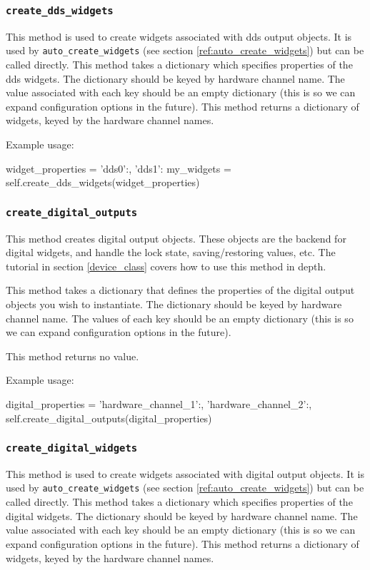 \documentclass[12pt]{article}
\begin{document}
\subsubsection{\texttt{create\_dds\_widgets}}\label{ref:create_dds_widgets}
This method is used to create widgets associated with dds output objects.
It is used by \texttt{auto\_create\_widgets} (see section \ref{ref:auto_create_widgets}) but can be called directly.
This method takes a dictionary which specifies properties of the dds widgets.
The dictionary should be keyed by hardware channel name.
The value associated with each key should be an empty dictionary (this is so we can expand configuration options in the future).
This method returns a dictionary of widgets, keyed by the hardware channel names.

Example usage:
\begin{python}
widget_properties = {'dds0':{},
                     'dds1':{}
                    }
my_widgets = self.create_dds_widgets(widget_properties)
\end{python}


\subsubsection{\texttt{create\_digital\_outputs}}\label{ref:create_digital_outputs}
This method creates digital output objects. 
These objects are the backend for digital widgets, and handle the lock state,  saving/restoring values, etc.
The tutorial in section \ref{device_class} covers how to use this method in depth.

This method takes a dictionary that defines the properties of the digital output objects you wish to instantiate. 
The dictionary should be keyed by hardware channel name.
The values of each key should be an empty dictionary (this is so we can expand configuration options in the future).

This method returns no value.

Example usage:
\begin{python}
    digital_properties = {'hardware_channel_1':{},
                         'hardware_channel_2':{},
                        }
    self.create_digital_outputs(digital_properties)
\end{python}


\subsubsection{\texttt{create\_digital\_widgets}}\label{ref:create_digital_widgets}
This method is used to create widgets associated with digital output objects.
It is used by \texttt{auto\_create\_widgets} (see section \ref{ref:auto_create_widgets}) but can be called directly.
This method takes a dictionary which specifies properties of the digital widgets.
The dictionary should be keyed by hardware channel name.
The value associated with each key should be an empty dictionary (this is so we can expand configuration options in the future).
This method returns a dictionary of widgets, keyed by the hardware channel names.
\end{document}
